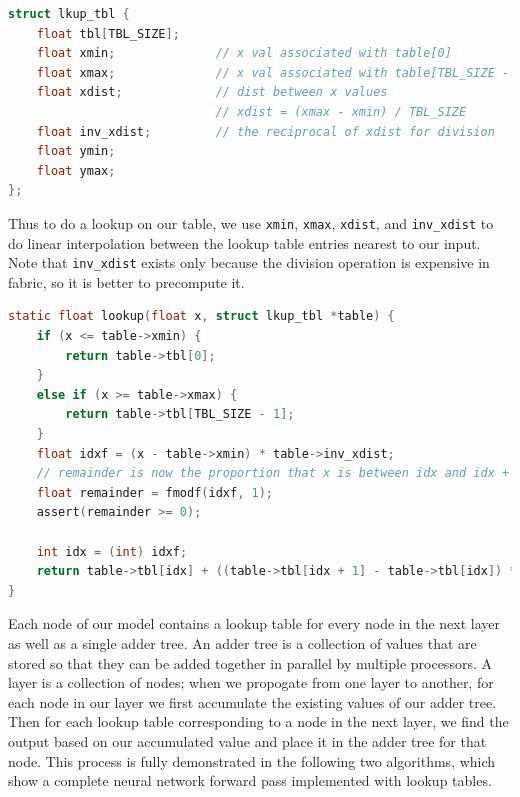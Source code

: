 \documentclass[psamsfonts]{amsart}
\theoremstyle{definition}
\theoremstyle{remark}
\numberwithin{equation}{section}
\begin{document}
\begin{lstlisting}[language=C]
struct lkup_tbl {
    float tbl[TBL_SIZE];
    float xmin;              // x val associated with table[0]
    float xmax;              // x val associated with table[TBL_SIZE - 1]
    float xdist;             // dist between x values 
                             // xdist = (xmax - xmin) / TBL_SIZE
    float inv_xdist;         // the reciprocal of xdist for division
    float ymin;
    float ymax;
};
\end{lstlisting}

Thus to do a lookup on our table, we use \texttt{xmin}, \texttt{xmax}, \texttt{xdist}, and \texttt{inv\_xdist} to do linear interpolation between the lookup table entries nearest to our input. Note that \texttt{inv\_xdist} exists only because the division operation is expensive in fabric, so it is better to precompute it.

\begin{lstlisting}[language=C]
static float lookup(float x, struct lkup_tbl *table) {
    if (x <= table->xmin) {
        return table->tbl[0];
    }
    else if (x >= table->xmax) {
        return table->tbl[TBL_SIZE - 1];
    }
    float idxf = (x - table->xmin) * table->inv_xdist;
    // remainder is now the proportion that x is between idx and idx + 1
    float remainder = fmodf(idxf, 1);
    assert(remainder >= 0);

    int idx = (int) idxf;
    return table->tbl[idx] + ((table->tbl[idx + 1] - table->tbl[idx]) * remainder);
}
\end{lstlisting}

Each node of our model contains a lookup table for every node in the next layer as well as a single adder tree. An adder tree is a collection of values that are stored so that they can be added together in parallel by multiple processors. A layer is a collection of nodes; when we propogate from one layer to another, for each node in our layer we first accumulate the existing values of our adder tree. Then for each lookup table corresponding to a node in the next layer, we find the output based on our accumulated value and place it in the adder tree for that node. This process is fully demonstrated in the following two algorithms, which show a complete neural network forward pass implemented with lookup tables.
\end{document}
